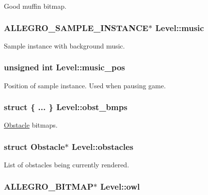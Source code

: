 \-Good muffin bitmap. \hypertarget{structLevel_a41c6aae8f508e078b02c291e1d6f8e67}{
\subsubsection[{music}]{\setlength{\rightskip}{0pt plus 5cm}\-A\-L\-L\-E\-G\-R\-O\-\_\-\-S\-A\-M\-P\-L\-E\-\_\-\-I\-N\-S\-T\-A\-N\-C\-E$\ast$ {\bf \-Level\-::music}}}\label{structLevel_a41c6aae8f508e078b02c291e1d6f8e67}
\-Sample instance with background music. \hypertarget{structLevel_a13e322deb3298846260af31324e5b492}{
\subsubsection[{music\-\_\-pos}]{\setlength{\rightskip}{0pt plus 5cm}unsigned int {\bf \-Level\-::music\-\_\-pos}}}\label{structLevel_a13e322deb3298846260af31324e5b492}
\-Position of sample instance. \-Used when pausing game. \hypertarget{structLevel_aeb52cb0b931eae0233dd1b50f2c02bf2}{
\subsubsection[{obst\-\_\-bmps}]{\setlength{\rightskip}{0pt plus 5cm}struct \{ ... \}   {\bf \-Level\-::obst\-\_\-bmps}}}\label{structLevel_aeb52cb0b931eae0233dd1b50f2c02bf2}
\hyperlink{structObstacle}{\-Obstacle} bitmaps. \hypertarget{structLevel_a4b4ac826580c681b588dae8ae0dde418}{
\subsubsection[{obstacles}]{\setlength{\rightskip}{0pt plus 5cm}struct {\bf \-Obstacle}$\ast$ {\bf \-Level\-::obstacles}}}\label{structLevel_a4b4ac826580c681b588dae8ae0dde418}
\-List of obstacles being currently rendered. \hypertarget{structLevel_af504e3f628040bc2a2913a50253e856d}{
\subsubsection[{owl}]{\setlength{\rightskip}{0pt plus 5cm}\-A\-L\-L\-E\-G\-R\-O\-\_\-\-B\-I\-T\-M\-A\-P$\ast$ {\bf \-Level\-::owl}}}\label{structLevel_af504e3f628040bc2a2913a50253e856d}
